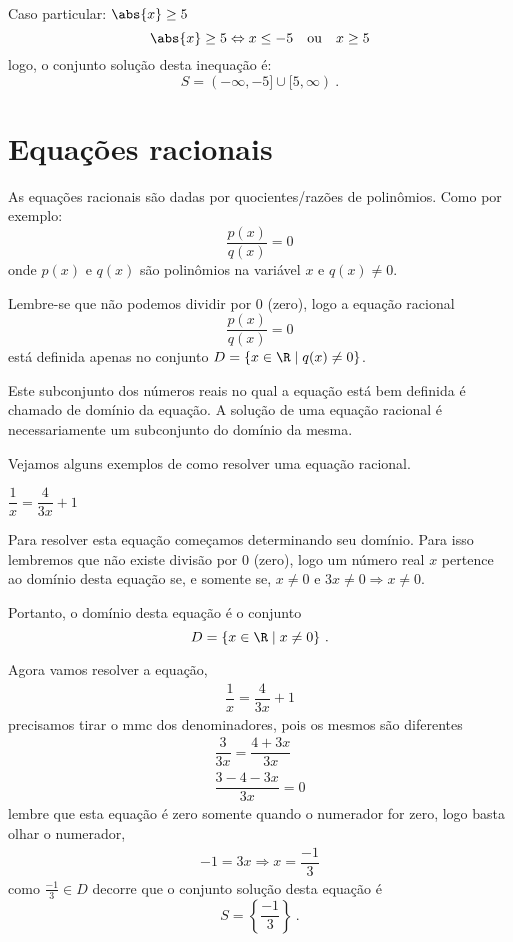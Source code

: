 \begin{exem}
   Caso particular: $\abs{x} \geq 5$
\begin{equation}
\abs{x} \geq 5 \Leftrightarrow x \leq -5 \ \ \text{ ou } \ \ x \geq 5
\end{equation}
   logo, o conjunto solução desta inequação é:
\begin{equation}
S= (-\infty, -5] \cup [5, \infty) \ . 
\end{equation}
 \end{exem}
 
 \section{Equações racionais}
 \vskip0.3cm
 \colorbox{azul}{
 \begin{minipage}{0.9\linewidth}
 \begin{center}
  As equações racionais são dadas por quocientes/razões de polinômios. Como por exemplo:
  \[\dfrac{p(x)}{q(x)}= 0\]
  onde $p(x)$ e $q(x)$ são polinômios na variável $x$ e $q(x) \neq 0$.
 \end{center}
 \end{minipage}}
 \vskip0.3cm
 
 Lembre-se que não podemos dividir por $0$ (zero), logo a equação racional
 \[\dfrac{p(x)}{q(x)}= 0\]
 está definida apenas no conjunto $D= \{x \in \R \mid q(x) \neq 0\}$.
 
 Este subconjunto dos números reais no qual a equação está bem definida é chamado de domínio da equação. A solução de uma equação racional é necessariamente um subconjunto do domínio da mesma.
 
 Vejamos alguns exemplos de como resolver uma equação racional.
 
 \begin{exem} $\dfrac{1}{x}= \dfrac{4}{3x} + 1$
 
 Para resolver esta equação começamos determinando seu domínio. Para isso lembremos que não existe divisão por $0$ (zero), logo um número real $x$ pertence ao domínio desta equação se, e somente se, 
 $x \neq 0$ e $3x \neq 0 \Rightarrow x \neq 0$.
 
 Portanto, o domínio desta equação é o conjunto
 \[D= \{ x \in \R \mid x \neq 0 \} \ . \]
 
 Agora vamos resolver a equação,
 \begin{eqnarray}
 \dfrac{1}{x} = \dfrac{4}{3x} + 1
 \end{eqnarray}
 precisamos tirar o mmc dos denominadores, pois os mesmos são diferentes
 \begin{eqnarray}
 \dfrac{3}{3x}= \dfrac{4 + 3x}{3x} \\
 \dfrac{3-4-3x}{3x} = 0 
 \end{eqnarray}
 lembre que esta equação é zero somente quando o numerador for zero, logo basta olhar o numerador,
 \begin{eqnarray}
 -1 = 3x \Rightarrow x= \dfrac{-1}{3}
 \end{eqnarray}
 como $\frac{-1}{3} \in D$ decorre que o conjunto solução desta equação é
 \[S= \left\{ \dfrac{-1}{3} \right\} \ . \]
 \end{exem}
 
